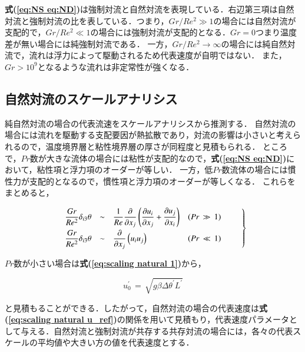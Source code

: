 \noindent \textbf{式(\ref{eq:NS eq:ND})}は強制対流と自然対流を表現している．右辺第三項は自然対流と強制対流の比を表している．つまり，$Gr/Re^2 \gg 1$の場合には自然対流が支配的で，$Gr/Re^2 \ll 1$の場合には強制対流が支配的となる．$Gr = 0$つまり温度差が無い場合には純強制対流である．
一方，$Gr/Re^2 \rightarrow \infty$の場合には純自然対流で，流れは浮力によって駆動されるため代表速度が自明ではない．
また，$Gr > 10^9$となるような流れは非定常性が強くなる．

\subsection{自然対流のスケールアナリシス}

純自然対流の場合の代表流速をスケールアナリシスから推測する\cite{nakayama:02:netsuryuutai}．
自然対流の場合には流れを駆動する支配要因が熱拡散であり，対流の影響は小さいと考えられるので，温度境界層と粘性境界層の厚さが同程度と見積もられる．
ところで，$Pr$数が大きな流体の場合には粘性が支配的なので，\textbf{式(\ref{eq:NS eq:ND})}において，粘性項と浮力項のオーダーが等しい．
一方，低$Pr$数流体の場合には慣性力が支配的となるので，慣性項と浮力項のオーダーが等しくなる．
これらをまとめると，

\begin{equation}
\left.
\begin{array}{llll}
\vspace{1mm}
\displaystyle{ \frac{Gr}{Re^2} \delta_{i3} \theta } & \sim & 
\displaystyle{ \frac{1}{Re} \frac{\partial}{\partial x_j} \left({ \frac{\partial u_i}{\partial x_j} + \frac{\partial u_j}{\partial x_i} }\right) } &
(Pr \, \gg \, 1)\\
\displaystyle{ \frac{Gr}{Re^2} \delta_{i3} \theta } & \sim & 
\displaystyle{ \frac{\partial}{\partial x_j} \left({ u_i u_j }\right) } & (Pr \, \ll \, 1)
\end{array} \qquad \right \}
\label{eq:scaling natural 1}
\end{equation}

\noindent $Pr$数が小さい場合は\textbf{式(\ref{eq:scaling natural 1})}から，

\begin{equation}
u_{\mathit 0}^\prime \, = \, \sqrt{g \beta \Delta \theta^\prime L^\prime}
\label{eq:scaling natural u_ref}
\end{equation}

\noindent と見積もることができる．したがって，自然対流の場合の代表速度は\textbf{式(\ref{eq:scaling natural u_ref})}の関係を用いて見積もり，代表速度パラメータとして与える．自然対流と強制対流が共存する共存対流の場合には，各々の代表スケールの平均値や大きい方の値を代表速度とする．



